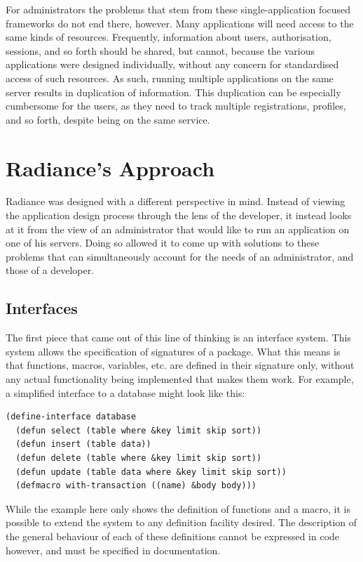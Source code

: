 \documentclass{sig-alternate}
\begin{document}
For administrators the problems that stem from these single-application focused frameworks do not end there, however. Many applications will need access to the same kinds of resources. Frequently, information about users, authorisation, sessions, and so forth should be shared, but cannot, because the various applications were designed individually, without any concern for standardised access of such resources. As such, running multiple applications on the same server results in duplication of information. This duplication can be especially cumbersome for the users, as they need to track multiple registrations, profiles, and so forth, despite being on the same service. \\

\section{Radiance's Approach}
Radiance was designed with a different perspective in mind. Instead of viewing the application design process through the lens of the developer, it instead looks at it from the view of an administrator that would like to run an application on one of his servers. Doing so allowed it to come up with solutions to these problems that can simultaneously account for the needs of an administrator, and those of a developer. \\

\subsection{Interfaces}
The first piece that came out of this line of thinking is an interface system. This system allows the specification of signatures of a package. What this means is that functions, macros, variables, etc. are defined in their signature only, without any actual functionality being implemented that makes them work. For example, a simplified interface to a database might look like this:

\begin{verbatim}
(define-interface database
  (defun select (table where &key limit skip sort))
  (defun insert (table data))
  (defun delete (table where &key limit skip sort))
  (defun update (table data where &key limit skip sort))
  (defmacro with-transaction ((name) &body body)))
\end{verbatim}

While the example here only shows the definition of functions and a macro, it is possible to extend the system to any definition facility desired. The description of the general behaviour of each of these definitions cannot be expressed in code however, and must be specified in documentation. \\
\end{document}
